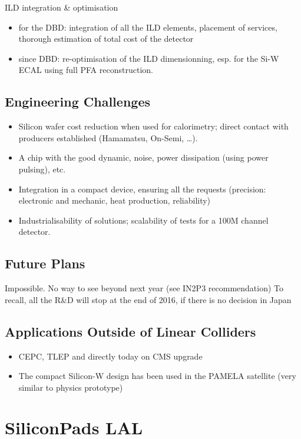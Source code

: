 ILD integration \& optimisation
\begin{itemize}
	\item for the DBD: integration of all the ILD elements, placement of services, thorough estimation of total cost of the detector
	\item since DBD: re-optimisation of the ILD dimensionning, esp. for the Si-W ECAL using full PFA reconstruction.
\end{itemize}

\subsection{Engineering Challenges}
\begin{itemize}
	\item Silicon wafer cost reduction when used for calorimetry; direct contact with producers established (Hamamatsu, On-Semi, \ldots).
	\item A chip with the good dynamic, noise, power dissipation (using power pulsing), etc. 
	\item Integration in a compact device, ensuring all the requests (precision: electronic and mechanic, heat production, reliability)
	\item Industrialisability of solutions; scalability of tests for a 100M channel detector.
\end{itemize}
\subsection{Future Plans}
Impossible. No way to see beyond next year (see IN2P3 recommendation)
To recall, all the R\&D will stop at the end of 2016, if there is no decision in Japan
\subsection{Applications Outside of Linear Colliders}
\begin{itemize}
	\item CEPC, TLEP and directly today on CMS upgrade
	\item The compact Silicon-W design has been used in the PAMELA satellite (very similar to physics prototype)
\end{itemize}

\section{SiliconPads LAL}
